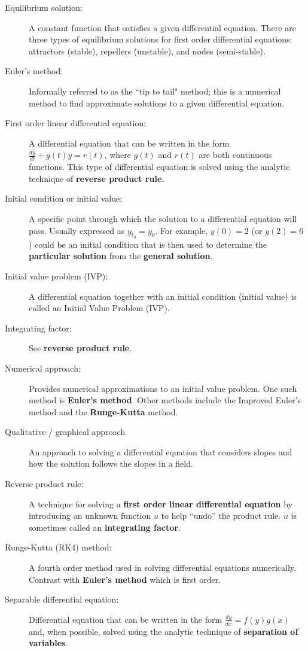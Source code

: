 \begin{description}
\item[Equilibrium solution:] A constant function that satisfies a given differential equation. There are three types of equilibrium solutions for first order differential equations: attractors (stable), repellers (unstable), and nodes (semi-stable). 
\item[Euler's method:] Informally referred to as the ``tip to tail" method; this is a numerical method to find approximate solutions to a given differential equation.
\item[First order linear differential equation:] A differential equation that can be written in the form $\frac{dy}{dt}+ g(t)y =r(t)$, where $g(t)$ and $r(t)$ are both continuous functions. This type of differential equation is solved using the analytic technique of \textbf{reverse product rule.}
\item[Initial condition or initial value:] A specific point through which the solution to a differential equation will pass. Usually expressed as $y_{t_0} = y_0$. For example, $y(0)=2$ (or $y(2)=6$) could be an initial condition that is then used to determine the \textbf{particular solution} from the \textbf{general solution}.
\item[Initial value problem (IVP):] A differential equation together with an initial condition (initial value) is called an Initial Value Problem (IVP).
\item[Integrating factor:] See \textbf{reverse product rule}.
\item[Numerical approach:] Provides numerical approximations to an initial value problem. One such method is \textbf{Euler's method}. Other methods include the Improved Euler's method and the \textbf{Runge-Kutta} method.
\item[Qualitative / graphical approach] An approach to solving a differential equation that considers slopes and how the solution follows the slopes in a field.
\item[Reverse product rule:] A technique for solving a \textbf{first order linear differential equation} by introducing an unknown function $u$ to help ``undo'' the product rule. $u$ is sometimes called an \textbf{integrating factor}.
\item[Runge-Kutta (RK4) method:] A fourth order method used in solving differential equations numerically. Contrast with \textbf{Euler's method} which is first order.
\item[Separable differential equation:] Differential equation that can be written in the form $\frac{dy}{dx}=f(y)g(x)$ and, when possible, solved using the analytic technique of \textbf{separation of variables}.

\end{description}

